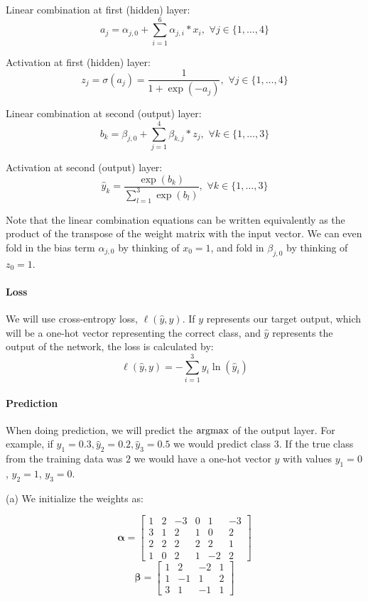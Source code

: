 Linear combination at first (hidden) layer:
$$a_j= \alpha_{j,0} + \sum_{i=1}^6 \alpha_{j,i}*x_i,\,\, \forall j \in \{1,\ldots,4\}$$

Activation at first (hidden) layer:
$$z_j = \sigma(a_j) = \frac{1}{1+\exp(-a_j)},\,\, \forall j \in \{1,\ldots,4\}$$

Linear combination at second (output) layer:
$$b_k = \beta_{j,0} + \sum_{j=1}^4 \beta_{k,j}*z_j,\,\, \forall k \in \{1,\ldots,3\}$$

Activation at second (output) layer:
$$\hat{y}_k = \frac{\exp(b_k)}{\sum\limits_{l=1}^3 \exp(b_l)},\,\, \forall k \in \{1,\ldots,3\}$$

Note that the linear combination equations can be written equivalently as the product of the transpose of the weight matrix with the input vector. We can even fold in the bias term $\alpha_{j,0}$ by thinking of $x_0 = 1$, and fold in $\beta_{j,0}$ by thinking of $z_0 = 1$.

\paragraph{Loss}

We will use cross-entropy loss, $\ell(\hat{y},y)$. If $y$ represents our target output, which will be a one-hot vector representing the correct class, and $\hat{y}$ represents the output of the network, the loss is calculated by:
$$\ell(\hat{y},y) = - \sum_{i=1}^3 y_i \ln(\hat{y}_i)$$

\paragraph{Prediction}
When doing prediction, we will predict the $\mathop{\rm argmax}$ of the output layer. For example, if $\hat{y}_1=0.3, \hat{y}_2=0.2, \hat{y}_3=0.5$ we would predict class 3. If the true class from the training data was $2$ we would have a one-hot vector $y$ with values $y_1=0$, $y_2=1$, $y_3=0$.

(a)  We initialize the weights as:
\begin{center}
$$\boldsymbol{\alpha}=
    \begin{bmatrix}
    1 & 2 & -3 & 0 & 1 & -3 \\
    3 & 1 & 2 & 1 & 0 & 2 \\
    2 & 2 & 2 & 2 & 2 & 1 \\
    1 & 0 & 2 & 1 & -2 & 2
    \end{bmatrix}$$
$$\boldsymbol{\beta}=
    \begin{bmatrix}
    1 & 2 & -2 & 1 \\
    1 & -1 & 1 & 2 \\
    3 & 1 & -1 & 1
    \end{bmatrix}
$$
\end{center}

